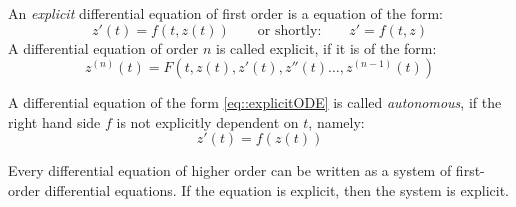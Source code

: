 \begin{definition}
  An \textit{explicit} differential equation of first order is	a equation of the form:
  \begin{equation}
    z'(t)=f\left(t,z(t)\right) \qquad \text{or shortly:} \qquad z'=f\left(t,z\right)
	\label{eq::explicitODE}
  \end{equation}
  A differential equation of order $n$ is called explicit, if it is of the form:
  \begin{equation}
    z^{(n)}(t) = F\left(t,z(t),z'(t),z''(t)\dots,z^{(n-1)}(t)\right)
  \end{equation}
\end{definition}

\begin{definition}
  A differential equation of the form \eqref{eq::explicitODE} is called	\textit{autonomous},
  if the right hand side $f$ is not explicitly dependent on $t$, namely:
  \begin{equation}
    z'(t)=f\left(z(t)\right)
  \end{equation}
\end{definition}

\begin{lemma}
  Every differential equation of higher order can be written as a 
  system of first-order differential equations.
  If the equation is explicit, then the system is explicit.
\end{lemma}

